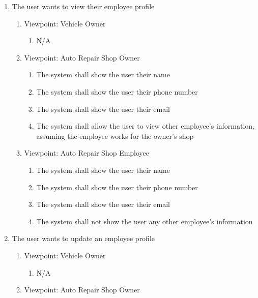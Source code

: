 \documentclass[12pt]{article}
\begin{document}
\begin{enumerate}[resume*=business_events]
	\item The user wants to view their employee profile
	      \begin{enumerate}[VP\arabic*.]
		      \item Viewpoint: Vehicle Owner
		            \begin{enumerate}
			            \item[] N/A
		            \end{enumerate}
		      \item Viewpoint: Auto Repair Shop Owner
		            \begin{enumerate}
			            \item The system shall show the user their name
			            \item The system shall show the user their phone number
			            \item The system shall show the user their email
			            \item The system shall allow the user to view other employee's information, assuming the employee works
			                  for the owner's shop
		            \end{enumerate}
		      \item Viewpoint: Auto Repair Shop Employee
		            \begin{enumerate}
			            \item The system shall show the user their name
			            \item The system shall show the user their phone number
			            \item The system shall show the user their email
			            \item The system shall not show the user any other employee's information
		            \end{enumerate}
	      \end{enumerate}
	\item The user wants to update an employee profile
	      \begin{enumerate}[VP\arabic*.]
		      \item Viewpoint: Vehicle Owner
		            \begin{enumerate}
			            \item[] N/A
		            \end{enumerate}
		      \item Viewpoint: Auto Repair Shop Owner
		            \begin{enumerate}

\end{enumerate}
\end{enumerate}
\end{enumerate}
\end{document}
